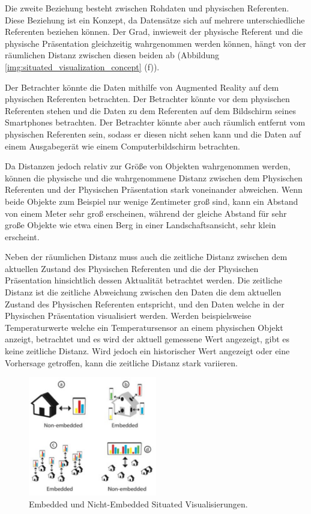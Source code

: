 Die zweite Beziehung besteht zwischen Rohdaten und physischen Referenten. Diese Beziehung ist ein Konzept, da Datensätze sich auf mehrere unterschiedliche Referenten beziehen können. 
Der Grad, inwieweit der physische Referent und die physische Präsentation gleichzeitig wahrgenommen werden können, hängt von der räumlichen Distanz zwischen diesen beiden ab (Abbildung \ref{img:situated_visualization_concept} (f)). 

Der Betrachter könnte die Daten mithilfe von Augmented Reality auf dem physischen Referenten betrachten. Der Betrachter könnte vor dem physischen Referenten stehen und die Daten zu dem Referenten auf
dem Bildschirm seines Smartphones betrachten. Der Betrachter könnte aber auch räumlich entfernt vom physischen Referenten sein, sodass er diesen nicht sehen kann und die Daten auf einem Ausgabegerät 
wie einem Computerbildschirm betrachten. 

Da Distanzen jedoch relativ zur Größe von Objekten wahrgenommen werden, können die physische und die wahrgenommene Distanz zwischen dem Physischen Referenten und der Physischen Präsentation stark voneinander abweichen. Wenn beide Objekte zum Beispiel nur wenige Zentimeter groß sind, kann ein Abstand von einem Meter sehr groß erscheinen, während der gleiche Abstand für sehr große Objekte wie etwa einen Berg in einer Landschaftsansicht, sehr klein erscheint. \cite[S.~194]{Marriott2018}


Neben der räumlichen Distanz muss auch die zeitliche Distanz zwischen dem aktuellen Zustand des Physischen Referenten und die der Physischen Präsentation hinsichtlich dessen 
Aktualität betrachtet werden. 
Die zeitliche Distanz ist die zeitliche Abweichung zwischen den Daten die dem aktuellen Zustand des Physischen Referenten entspricht, und den Daten welche in der Physischen Präsentation visualisiert werden.
Werden beispielsweise Temperaturwerte welche ein Temperatursensor an einem physischen Objekt anzeigt, betrachtet und es wird der aktuell gemessene Wert angezeigt, gibt es keine zeitliche Distanz. Wird jedoch ein
historischer Wert angezeigt oder eine Vorhersage getroffen, kann die zeitliche Distanz stark variieren. \cite{Willett2017}

\begin{figure}[H]
	\centering
	\includegraphics[width=0.5\textwidth]{resources/fundamentals/situated_visualization/embedded_visualization.png}
	\caption{Embedded und Nicht-Embedded Situated Visualisierungen. \cite[S.~195]{Marriott2018}}
	\label{img:embedded_visualization}
\end{figure}

